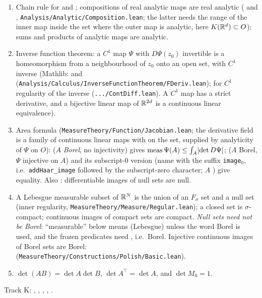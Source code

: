 \begingroup\raggedright
\begin{enumerate}[label=(X\arabic*)]
\item\label{bpP:p1:ext-comp} Chain rule for  and ; compositions of real analytic maps are real analytic ( and , \texttt{Analysis/Analytic/Composition.lean}; the latter needs the range of the inner map inside the set where the outer map is analytic, here $K(\mathbb{R}^d)\subset O$); sums and products of analytic maps are analytic.
\item\label{bpP:p1:ext-ift} Inverse function theorem: a $C^1$ map $\Psi$ with $D\Psi(z_0)$ invertible is a homeomorphism from a neighbourhood of $z_0$ onto an open set, with $C^1$ inverse (Mathlib:  and  (\texttt{Analysis/Calculus/InverseFunctionTheorem/FDeriv.lean}); for $C^1$ regularity of the inverse  (\texttt{.../ContDiff.lean}). A $C^1$ map has a strict derivative, and a bijective linear map of $\mathbb{R}^{2d}$ is a continuous linear equivalence).
\item\label{bpP:p1:ext-area} Area formula (\texttt{MeasureTheory/Function/Jacobian.lean}; the derivative field is a family of continuous linear maps with  on the set, supplied by analyticity of $\Psi$ on $O$):  ($A$ \emph{Borel}, no injectivity) gives $\operatorname{meas}\Psi(A)\le\int_A\lvert \det D\Psi\rvert$;  ($A$ Borel, $\Psi$ injective on $A$) and its subscript-$0$ version (name with the suffix \texttt{image}$_0$, i.e.\ \texttt{addHaar\_image} followed by the subscript-zero character; $A$ ) give equality. Also : differentiable images of null sets are null.
\item\label{bpP:p1:ext-borel} A Lebesgue measurable subset of $\mathbb{R}^N$ is the union of an $F_\sigma$ set and a null set (inner regularity, \texttt{MeasureTheory/Measure/Regular.lean}); a closed set is $\sigma$-compact; continuous images of compact sets are compact. \emph{Null sets need not be Borel}: ``measurable'' below means  (Lebesgue) unless the word Borel is used, and the frozen predicates need , i.e.\ Borel. Injective continuous images of Borel sets are Borel:  (\texttt{MeasureTheory/Constructions/Polish/Basic.lean}).
\item\label{bpP:p1:ext-det} $\det(AB)=\det A\det B$, $\det A^{\top}=\det A$, and $\det M_0=1$.
\end{enumerate}
\endgroup
Track K: , , , , .

